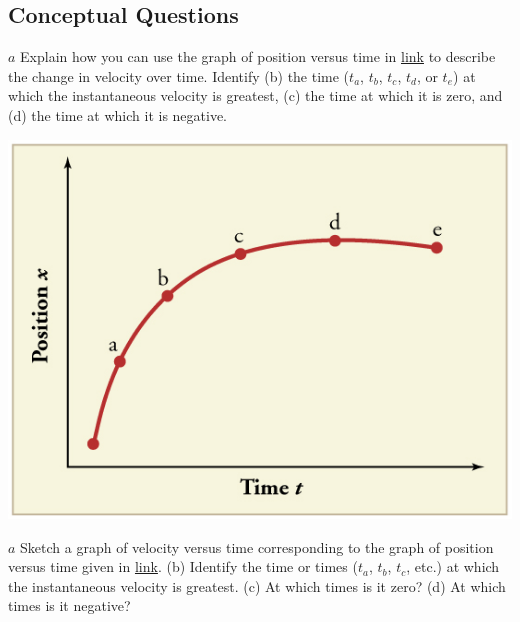 \documentclass[
]{book}
\newenvironment{conceptual-questions}{}{}
\begin{document}
\hypertarget{fs-id1773324}{}
\begin{conceptual-questions}

\hypertarget{conceptual-questions-6}{%
\subsection{Conceptual Questions}\label{conceptual-questions-6}}

\hypertarget{fs-id1550042}{}
\leavevmode\hypertarget{fs-id4182585}{}%
\(a\) Explain how you can use the graph of position versus time in
\protect\hyperlink{import-auto-id4064025}{link} to describe the
change in velocity over time. Identify (b) the time (\(t_{a}\), \(t_{b}\),
\(t_{c}\), \(t_{d}\), or \(t_{e}\)) at which the instantaneous velocity is
greatest, (c) the time at which it is zero, and (d) the time at which it
is negative.

\includegraphics{images/Figure_03_08Sol_01.jpg}

\hypertarget{fs-id4168594}{}
\leavevmode\hypertarget{fs-id1759884}{}%
\(a\) Sketch a graph of velocity versus time corresponding to the graph
of position versus time given in
\protect\hyperlink{import-auto-id2562897}{link}. (b) Identify the
time or times (\(t_{a}\), \(t_{b}\), \(t_{c}\), etc.) at which the
instantaneous velocity is greatest. (c) At which times is it zero? (d)
At which times is it negative?


\end{conceptual-questions}
\end{document}
